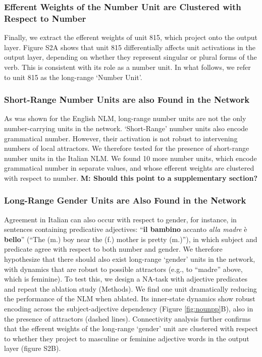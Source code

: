 \subsubsection{Efferent Weights of the Number Unit are Clustered with Respect to Number}
Finally, we extract the efferent weights of unit 815, which project onto the output layer. Figure S2A shows that unit 815 differentially affects unit activations in the output layer, depending on whether they represent singular or plural forms of the verb. This is consistent with its role as a number unit. In what follows, we refer to unit 815 as the long-range `Number Unit'.

\subsubsection{Short-Range Number Units are also Found in the Network}
As was shown for the English NLM, long-range number units are not the only number-carrying units in the network. `Short-Range' number units also encode grammatical number. However, their activation is not robust to intervening numbers of local attractors. We therefore tested for the presence of short-range number units in the Italian NLM. We found 10 more number units, which encode grammatical number in separate values, and whose efferent weights are clustered with respect to number. \textbf{M: Should this point to a supplementary section?}

\subsubsection{Long-Range Gender Units are Also Found in the Network }
Agreement in Italian can also occur with respect to gender, for instance, in sentences containing predicative adjectives: ``\textbf{il bambino} accanto \emph{alla madre} \`{e} \textbf{bello}'' (``The (m.) boy near the (f.) mother is pretty (m.)''), in which subject and predicate agree with respect to both number and gender. We therefore hypothesize that there should also exist long-range `gender' units in the network, with dynamics that are robust to possible attractors (e.g., to ``madre'' above, which is feminine). 
To test this, we design a NA-task with adjective predicates and repeat the ablation study (Methods). 
We find one unit dramatically reducing the performance of the NLM when ablated. Its inner-state dynamics show robust encoding across the subject-adjective dependency (Figure \ref{fig:nounpp}B), also in the presence of attractors (dashed lines). Connectivity analysis further confirms that the efferent weights of the long-range `gender' unit are clustered with respect to whether they project to masculine or feminine adjective words in the output layer (figure S2B).



